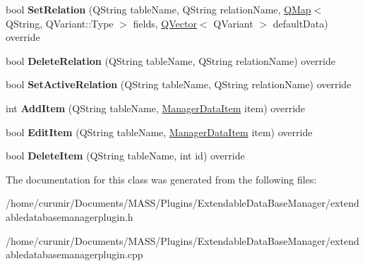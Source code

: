 \begin{DoxyCompactItemize}
\item 
bool {\bfseries Set\+Relation} (Q\+String table\+Name, Q\+String relation\+Name, \hyperlink{class_q_map}{Q\+Map}$<$ Q\+String, Q\+Variant\+::\+Type $>$ fields, \hyperlink{class_q_vector}{Q\+Vector}$<$ Q\+Variant $>$ default\+Data) override\hypertarget{class_extendable_data_base_manager_plugin_a572eff2f383b0be3e99178e6dcee78e9}{}\label{class_extendable_data_base_manager_plugin_a572eff2f383b0be3e99178e6dcee78e9}

\item 
bool {\bfseries Delete\+Relation} (Q\+String table\+Name, Q\+String relation\+Name) override\hypertarget{class_extendable_data_base_manager_plugin_a75fccf6c256cf6500ac1d7421c131bc2}{}\label{class_extendable_data_base_manager_plugin_a75fccf6c256cf6500ac1d7421c131bc2}

\item 
bool {\bfseries Set\+Active\+Relation} (Q\+String table\+Name, Q\+String relation\+Name) override\hypertarget{class_extendable_data_base_manager_plugin_a2a8f2e7f2fbeef891da297dadd0cd548}{}\label{class_extendable_data_base_manager_plugin_a2a8f2e7f2fbeef891da297dadd0cd548}

\item 
int {\bfseries Add\+Item} (Q\+String table\+Name, \hyperlink{class_i_extendable_data_base_manager_plugin_1_1_manager_data_item}{Manager\+Data\+Item} item) override\hypertarget{class_extendable_data_base_manager_plugin_a1fe950472f4798d7278dca6b24055c9c}{}\label{class_extendable_data_base_manager_plugin_a1fe950472f4798d7278dca6b24055c9c}

\item 
bool {\bfseries Edit\+Item} (Q\+String table\+Name, \hyperlink{class_i_extendable_data_base_manager_plugin_1_1_manager_data_item}{Manager\+Data\+Item} item) override\hypertarget{class_extendable_data_base_manager_plugin_a09ee5b2121ac6f5e3311701a59584fc6}{}\label{class_extendable_data_base_manager_plugin_a09ee5b2121ac6f5e3311701a59584fc6}

\item 
bool {\bfseries Delete\+Item} (Q\+String table\+Name, int id) override\hypertarget{class_extendable_data_base_manager_plugin_a91081c54f128faf88cc4f25aaf9980f4}{}\label{class_extendable_data_base_manager_plugin_a91081c54f128faf88cc4f25aaf9980f4}

\end{DoxyCompactItemize}


The documentation for this class was generated from the following files\+:\begin{DoxyCompactItemize}
\item 
/home/curunir/\+Documents/\+M\+A\+S\+S/\+Plugins/\+Extendable\+Data\+Base\+Manager/extendabledatabasemanagerplugin.\+h\item 
/home/curunir/\+Documents/\+M\+A\+S\+S/\+Plugins/\+Extendable\+Data\+Base\+Manager/extendabledatabasemanagerplugin.\+cpp\end{DoxyCompactItemize}
